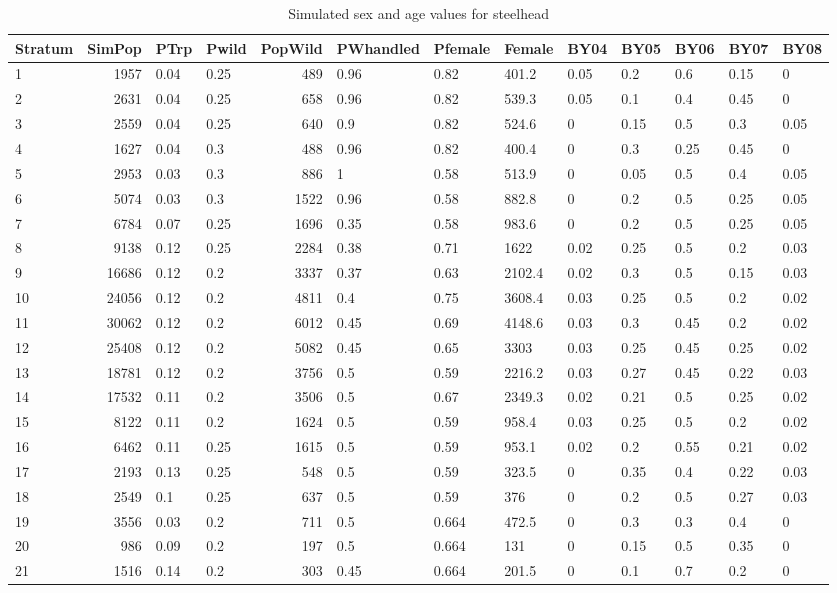 \documentclass[11pt]{article}
\begin{document}
\begin{sidewaystable} %
\caption{Simulated sex and age values for steelhead}
\label{table:SHsim}
\footnotesize
\begin{tabular}{ | l | r | l | l | r | l | l | l | l |l | l | l | l | }
\hline
Stratum&SimPop&PTrp&Pwild&PopWild&PWhandled&Pfemale&Female&BY04&BY05&BY06&BY07&BY08 \\ \hline
1&1957&0.04&0.25&489&0.96&0.82&401.2&0.05&0.2&0.6&0.15&0 \\ \hline
2&2631&0.04&0.25&658&0.96&0.82&539.3&0.05&0.1&0.4&0.45&0 \\ \hline
3&2559&0.04&0.25&640&0.9&0.82&524.6&0&0.15&0.5&0.3&0.05 \\ \hline
4&1627&0.04&0.3&488&0.96&0.82&400.4&0&0.3&0.25&0.45&0 \\ \hline
5&2953&0.03&0.3&886&1&0.58&513.9&0&0.05&0.5&0.4&0.05 \\ \hline
6&5074&0.03&0.3&1522&0.96&0.58&882.8&0&0.2&0.5&0.25&0.05 \\ \hline
7&6784&0.07&0.25&1696&0.35&0.58&983.6&0&0.2&0.5&0.25&0.05 \\ \hline
8&9138&0.12&0.25&2284&0.38&0.71&1622&0.02&0.25&0.5&0.2&0.03 \\ \hline
9&16686&0.12&0.2&3337&0.37&0.63&2102.4&0.02&0.3&0.5&0.15&0.03 \\ \hline
10&24056&0.12&0.2&4811&0.4&0.75&3608.4&0.03&0.25&0.5&0.2&0.02 \\ \hline
11&30062&0.12&0.2&6012&0.45&0.69&4148.6&0.03&0.3&0.45&0.2&0.02 \\ \hline
12&25408&0.12&0.2&5082&0.45&0.65&3303&0.03&0.25&0.45&0.25&0.02 \\ \hline
13&18781&0.12&0.2&3756&0.5&0.59&2216.2&0.03&0.27&0.45&0.22&0.03 \\ \hline
14&17532&0.11&0.2&3506&0.5&0.67&2349.3&0.02&0.21&0.5&0.25&0.02 \\ \hline
15&8122&0.11&0.2&1624&0.5&0.59&958.4&0.03&0.25&0.5&0.2&0.02 \\ \hline
16&6462&0.11&0.25&1615&0.5&0.59&953.1&0.02&0.2&0.55&0.21&0.02 \\ \hline
17&2193&0.13&0.25&548&0.5&0.59&323.5&0&0.35&0.4&0.22&0.03 \\ \hline
18&2549&0.1&0.25&637&0.5&0.59&376&0&0.2&0.5&0.27&0.03 \\ \hline
19&3556&0.03&0.2&711&0.5&0.664&472.5&0&0.3&0.3&0.4&0 \\ \hline
20&986&0.09&0.2&197&0.5&0.664&131&0&0.15&0.5&0.35&0 \\ \hline
21&1516&0.14&0.2&303&0.45&0.664&201.5&0&0.1&0.7&0.2&0 \\ \hline

\end{tabular}
\end{sidewaystable}
\end{document}
